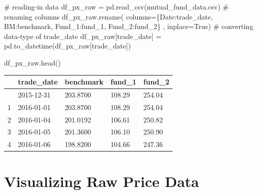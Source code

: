 \documentclass[
  letterpaper,
  DIV=11,
  numbers=noendperiod]{scrreprt}
\newenvironment{Shaded}{\begin{snugshade}}{\end{snugshade}}
\newcommand{\CommentTok}[1]{\textcolor[rgb]{0.37,0.37,0.37}{#1}}
\newcommand{\NormalTok}[1]{\textcolor[rgb]{0.00,0.23,0.31}{#1}}
\newcommand{\OperatorTok}[1]{\textcolor[rgb]{0.37,0.37,0.37}{#1}}
\newcommand{\StringTok}[1]{\textcolor[rgb]{0.13,0.47,0.30}{#1}}
\newcommand{\VariableTok}[1]{\textcolor[rgb]{0.07,0.07,0.07}{#1}}
\begin{document}
\begin{Shaded}
\begin{Highlighting}[]
\CommentTok{\# reading{-}in data}
\NormalTok{df\_px\_raw }\OperatorTok{=}\NormalTok{ pd.read\_csv(}\StringTok{\textquotesingle{}mutual\_fund\_data.csv\textquotesingle{}}\NormalTok{)}
\CommentTok{\# renaming columns}
\NormalTok{df\_px\_raw.rename(}
\NormalTok{    columns}\OperatorTok{=}\NormalTok{\{}\StringTok{\textquotesingle{}Date\textquotesingle{}}\NormalTok{:}\StringTok{\textquotesingle{}trade\_date\textquotesingle{}}\NormalTok{, }\StringTok{\textquotesingle{}BM\textquotesingle{}}\NormalTok{:}\StringTok{\textquotesingle{}benchmark\textquotesingle{}}\NormalTok{, }\StringTok{\textquotesingle{}Fund\_1\textquotesingle{}}\NormalTok{:}\StringTok{\textquotesingle{}fund\_1\textquotesingle{}}\NormalTok{, }\StringTok{\textquotesingle{}Fund\_2\textquotesingle{}}\NormalTok{:}\StringTok{\textquotesingle{}fund\_2\textquotesingle{}}\NormalTok{\}}
\NormalTok{    , inplace}\OperatorTok{=}\VariableTok{True}\NormalTok{)}
\CommentTok{\# converting data{-}type of trade\_date}
\NormalTok{df\_px\_raw[}\StringTok{\textquotesingle{}trade\_date\textquotesingle{}}\NormalTok{] }\OperatorTok{=}\NormalTok{ pd.to\_datetime(df\_px\_raw[}\StringTok{\textquotesingle{}trade\_date\textquotesingle{}}\NormalTok{])}

\NormalTok{df\_px\_raw.head()}
\end{Highlighting}
\end{Shaded}

\begin{longtable}[]{@{}lllll@{}}
\toprule\noalign{}
& trade\_date & benchmark & fund\_1 & fund\_2 \\
\midrule\noalign{}
\endhead
\bottomrule\noalign{}
\endlastfoot
0 & 2015-12-31 & 203.8700 & 108.29 & 254.04 \\
1 & 2016-01-01 & 203.8700 & 108.29 & 254.04 \\
2 & 2016-01-04 & 201.0192 & 106.61 & 250.82 \\
3 & 2016-01-05 & 201.3600 & 106.10 & 250.90 \\
4 & 2016-01-06 & 198.8200 & 104.66 & 247.36 \\
\end{longtable}

\hypertarget{visualizing-raw-price-data}{%
\section{Visualizing Raw Price Data}\label{visualizing-raw-price-data}}
\end{document}
